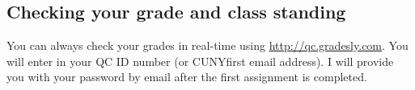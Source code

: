 \subsection*{Checking your grade and class standing}

You can always check your grades in real-time using \url{http://qc.gradesly.com}. You will enter in your QC ID number (or CUNYfirst email address). I will provide you with your password by email after the first assignment is completed.